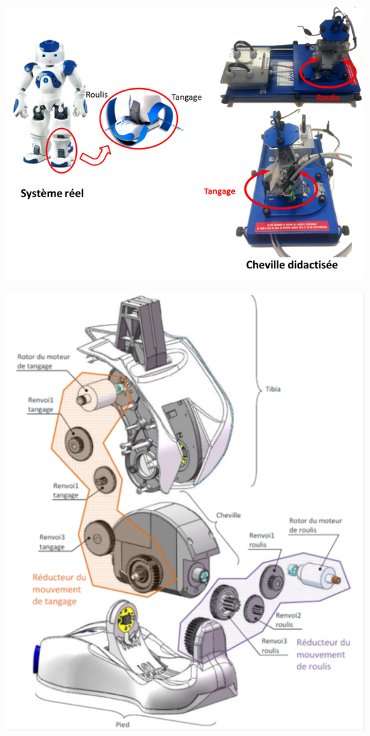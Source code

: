 \documentclass[10pt,fleqn]{article} %
\begin{document}
\begin{multicols}{2}
\setcounter{exo}{0}
\begin{center}
\includegraphics[width=\linewidth]{images/nao_02}
\end{center}

\begin{center}
\includegraphics[width=\linewidth]{images/nao_01}
\end{center}




\end{multicols}
\end{document}
